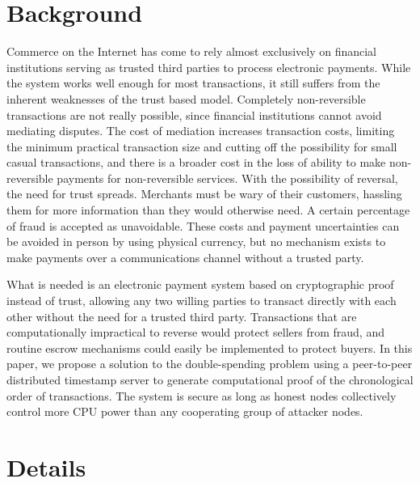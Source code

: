 \documentclass[a4paper,12pt]{report}
\begin{document}
\chapter{Background}
\label{Ch2} \setcounter{page}{1} 
\bigskip
Commerce on the Internet has come to rely almost exclusively on financial institutions serving as trusted third parties to process electronic payments. While the system works well enough for most transactions, it still suffers from the inherent weaknesses of the trust based model. Completely non-reversible transactions are not really possible, since financial institutions cannot avoid mediating disputes. The cost of mediation increases transaction costs, limiting the minimum practical transaction size and cutting off the possibility for small casual transactions, and there is a broader cost in the loss of ability to make non-reversible payments for non-reversible services. With the possibility of reversal, the need for trust spreads. Merchants must
be wary of their customers, hassling them for more information than they would otherwise need. A certain percentage of fraud is accepted as unavoidable. These costs and payment uncertainties can be avoided in person by using physical currency, but no mechanism exists to make payments over a communications channel without a trusted party.
\par What is needed is an electronic payment system based on cryptographic proof instead of trust,
allowing any two willing parties to transact directly with each other without the need for a trusted
third party. Transactions that are computationally impractical to reverse would protect sellers
from fraud, and routine escrow mechanisms could easily be implemented to protect buyers. In
this paper, we propose a solution to the double-spending problem using a peer-to-peer distributed
timestamp server to generate computational proof of the chronological order of transactions. The
system is secure as long as honest nodes collectively control more CPU power than any
cooperating group of attacker nodes.



\chapter{Details}
\label{Ch3} \setcounter{page}{1} 
\bigskip
\end{document}
